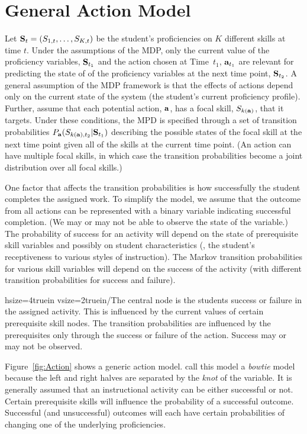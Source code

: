 \documentclass[12pt]{RR-article}
\begin{document}
\section{General Action Model}
\label{sect:Action}

Let ${\bf S}_t=(S_{1,t}, \ldots, S_{K,t})$ be the student's
proficiencies on $K$ different skills at time $t$.  Under the
assumptions of the MDP, only the current value of the proficiency
variables, ${\bf S}_{t_1}$ and the action chosen at Time~$t_1$, ${\bf
a}_{t_1}$ are relevant for predicting the state of of the proficiency
variables at the next time point, ${\bf S}_{t_2}$.  A general
assumption of the MDP framework is that the effects of actions depend
only on the current state of the system (the student's current
proficiency profile).  Further, assume that each potential action,
${\bf a}$, has a focal skill, $S_{k({\bf a})}$, that it targets.
Under these conditions, the MPD is specified through a set of
transition probabilities $P_{{\bf a}} (S_{k({\bf a}),t_2} | {\bf
S}_{t_1})$ describing the possible states of the focal skill at the
next time point given all of the skills at the current time point.
(An action can have multiple focal skills, in which case the
transition probabilities become a joint distribution over all focal
skills.)

One factor that affects the transition probabilities is how
successfully the student completes the assigned work.  To simplify the
model, we assume that the outcome from all actions can be represented
with a binary variable indicating successful completion.  (We may or
may not be able to observe the state of the  variable.)
The probability of success for an activity will depend on the state of
prerequisite skill variables and possibly on student characteristics
(\ie, the student's receptiveness to various styles of
instruction). The Markov transition probabilities for various skill
variables will depend on the success of the activity (with different
transition probabilities for success and failure).

hsize=4truein
vsize=2truein/{The central node is the students success or failure in
  the assigned activity.  This is influenced by the current values of
  certain prerequisite skill nodes.  The transition probabilities are
  influenced by the prerequisites only through the success or failure
  of the action.  Success may or may not be observed.}

Figure~\ref{fig:Action} shows a generic action
model.  call this model a \textit{bowtie} model
because the left and right halves are separated by the \textit{knot} of
the  variable.  It is generally assumed that an
instructional activity can be either successful or not.  Certain
prerequisite skills will influence the probability of a successful
outcome. Successful (and unsuccessful) outcomes will each have certain
probabilities of changing one of the underlying proficiencies.
\end{document}
